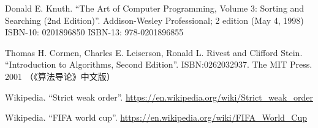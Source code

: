 \documentclass[b5paper]{ctexart}
\begin{document}
\begin{thebibliography}{99}

Donald E. Knuth. ``The Art of Computer Programming, Volume 3: Sorting and Searching (2nd Edition)''. Addison-Wesley Professional; 2 edition (May 4, 1998) ISBN-10: 0201896850 ISBN-13: 978-0201896855

Thomas H. Cormen, Charles E. Leiserson, Ronald L. Rivest and Clifford Stein.
``Introduction to Algorithms, Second Edition''. ISBN:0262032937. The MIT Press. 2001 （《算法导论》中文版）

Wikipedia. ``Strict weak order''. \url{https://en.wikipedia.org/wiki/Strict_weak_order}

Wikipedia. ``FIFA world cup''. \url{https://en.wikipedia.org/wiki/FIFA_World_Cup}

\end{thebibliography}
\end{document}
